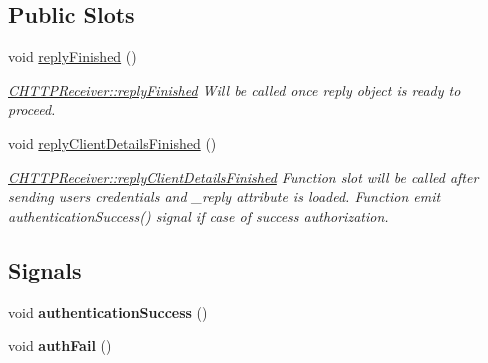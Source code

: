 \subsection*{Public Slots}
\begin{DoxyCompactItemize}
\item 
\mbox{\label{classCHTTPReceiver_a89fbad04ac34292edb59bbbd0a4e5104}} 
void \hyperlink{classCHTTPReceiver_a89fbad04ac34292edb59bbbd0a4e5104}{reply\+Finished} ()
\begin{DoxyCompactList}\small\item\em \hyperlink{classCHTTPReceiver_a89fbad04ac34292edb59bbbd0a4e5104}{C\+H\+T\+T\+P\+Receiver\+::reply\+Finished} Will be called once reply object is ready to proceed. \end{DoxyCompactList}\item 
\mbox{\label{classCHTTPReceiver_a61545418c181ff921634e181f804d8c7}} 
void \hyperlink{classCHTTPReceiver_a61545418c181ff921634e181f804d8c7}{reply\+Client\+Details\+Finished} ()
\begin{DoxyCompactList}\small\item\em \hyperlink{classCHTTPReceiver_a61545418c181ff921634e181f804d8c7}{C\+H\+T\+T\+P\+Receiver\+::reply\+Client\+Details\+Finished} Function slot will be called after sending user\textquotesingle{}s credentials and \+\_\+reply attribute is loaded. Function emit authentication\+Success() signal if case of success authorization. \end{DoxyCompactList}\end{DoxyCompactItemize}
\subsection*{Signals}
\begin{DoxyCompactItemize}
\item 
\mbox{\label{classCHTTPReceiver_a1a9361f16c0c514ef9e3a188b11601c9}} 
void {\bfseries authentication\+Success} ()
\item 
\mbox{\label{classCHTTPReceiver_a8a24d253e6b99319dd1d767aa5c1a99f}} 
void {\bfseries auth\+Fail} ()
\end{DoxyCompactItemize}
